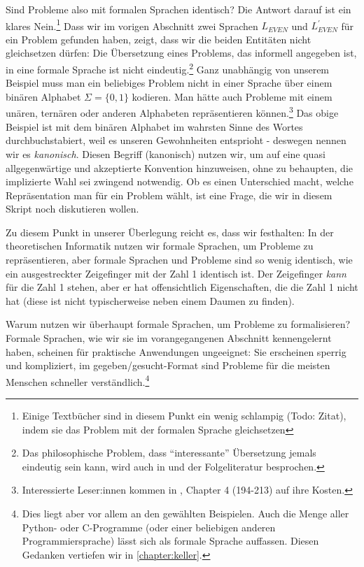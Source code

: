 Sind Probleme also mit formalen Sprachen identisch?
Die Antwort darauf ist ein klares Nein.\footnote{
Einige Textbücher sind in diesem Punkt ein wenig schlampig (Todo: Zitat),
indem sie das Problem mit der formalen Sprache gleichsetzen}
Dass wir im vorigen Abschnitt zwei Sprachen
$L_{EVEN}$ und $L_{EVEN}^{'}$ für ein Problem gefunden haben,
zeigt, dass wir die beiden Entitäten nicht gleichsetzen dürfen:
Die Übersetzung eines Problems, das informell angegeben ist,
in eine formale Sprache ist nicht eindeutig.\footnote{
Das philosophische Problem, dass ``interessante'' Übersetzung jemals eindeutig sein kann,
wird auch in \cite{quine} und der Folgeliteratur besprochen.}
Ganz unabhängig von unserem Beispiel muss man ein beliebiges Problem
nicht in einer Sprache über einem binären Alphabet $\Sigma = \{0,1\}$ kodieren.
Man hätte auch Probleme mit einem unären, ternären 
oder anderen Alphabeten repräsentieren können.\footnote{
    Interessierte Leser:innen kommen in \cite{knuth2}, Chapter 4 (194-213) auf ihre Kosten.
}
Das obige Beispiel ist mit dem binären Alphabet im wahrsten Sinne des Wortes durchbuchstabiert,
weil es unseren Gewohnheiten entsprioht
- deswegen nennen wir es \emph{kanonisch}.
Diesen Begriff (kanonisch) nutzen wir,
um auf eine quasi allgegenwärtige und akzeptierte Konvention hinzuweisen,
ohne zu behaupten, die implizierte Wahl sei zwingend notwendig.
Ob es einen Unterschied macht,
welche Repräsentation man für ein Problem wählt,
ist eine Frage,
die wir in diesem Skript noch diskutieren wollen.

Zu diesem Punkt in unserer Überlegung reicht es,
dass wir festhalten:
In der theoretischen Informatik nutzen wir formale Sprachen, um Probleme zu repräsentieren,
aber formale Sprachen und Probleme sind so wenig identisch,
wie ein ausgestreckter Zeigefinger mit der Zahl 1 identisch ist.
Der Zeigefinger \emph{kann} für die Zahl 1 stehen,
aber er hat offensichtlich Eigenschaften,
die die Zahl 1 nicht hat
(diese ist nicht typischerweise neben einem Daumen zu finden).

Warum nutzen wir überhaupt formale Sprachen,
um Probleme zu formalisieren?
Formale Sprachen,
wie wir sie im vorangegangenen Abschnitt kennengelernt haben,
scheinen für praktische Anwendungen ungeeignet:
Sie erscheinen sperrig und kompliziert,
im gegeben/gesucht-Format sind Probleme für die meisten Menschen schneller verständlich.\footnote{
Dies liegt aber vor allem an den gewählten Beispielen.
Auch die Menge aller Python- oder C-Programme (oder einer beliebigen anderen Programmiersprache)
lässt sich als formale Sprache auffassen.
Diesen Gedanken vertiefen wir in \autoref{chapter:keller}.}



